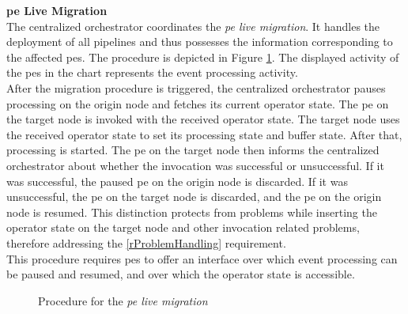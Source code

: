 \textbf{\acrlong{pe} Live Migration}\\
The centralized orchestrator coordinates the \textit{\acrshort{pe} live migration}. It handles the deployment of all pipelines and thus possesses the information corresponding to the affected \gls{pe}s. The procedure is depicted in Figure \ref{fOperatorStateMigration}. The displayed activity of the \gls{pe}s in the chart represents the event processing activity.\\
After the migration procedure is triggered, the centralized orchestrator pauses processing on the origin node and fetches its current operator state. The \gls{pe} on the target node is invoked with the received operator state. The target node uses the received operator state to set its processing state and buffer state. After that, processing is started. The \gls{pe} on the target node then informs the centralized orchestrator about whether the invocation was successful or unsuccessful. If it was successful, the paused \gls{pe} on the origin node is discarded. If it was unsuccessful, the \gls{pe} on the target node is discarded, and the \gls{pe} on the origin node is resumed. This distinction protects from problems while inserting the operator state on the target node and other invocation related problems, therefore addressing the \ref{rProblemHandling} requirement.\\
This procedure requires \gls{pe}s to offer an interface over which event processing can be paused and resumed, and over which the operator state is accessible.\par

\begin{figure}[H]
\centering
\graphicspath{{./figures/code/}}

\caption{Procedure for the \textit{\acrshort{pe} live migration}}
\label{fOperatorStateMigration}
\end{figure}


